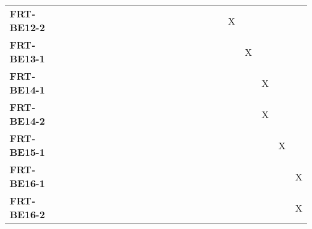 \documentclass[12pt, titlepage]{article}
\begin{document}
\begin{landscape}
\begin{longtable}{|l|cccccccccccccccc|}
		\textbf{FRT-BE12-2} & ~                                                         & ~            & ~            & ~            & ~            & ~            & ~            & ~            & ~            & ~             & ~             & X             & ~             & ~             & ~             & ~             \\
		\textbf{FRT-BE13-1} & ~                                                         & ~            & ~            & ~            & ~            & ~            & ~            & ~            & ~            & ~             & ~             & ~             & X             & ~             & ~             & ~             \\
		\textbf{FRT-BE14-1} & ~                                                         & ~            & ~            & ~            & ~            & ~            & ~            & ~            & ~            & ~             & ~             & ~             & ~             & X             & ~             & ~             \\
		\textbf{FRT-BE14-2} & ~                                                         & ~            & ~            & ~            & ~            & ~            & ~            & ~            & ~            & ~             & ~             & ~             & ~             & X             & ~             & ~             \\
		\textbf{FRT-BE15-1} & ~                                                         & ~            & ~            & ~            & ~            & ~            & ~            & ~            & ~            & ~             & ~             & ~             & ~             & ~             & X             & ~             \\
		\textbf{FRT-BE16-1} & ~                                                         & ~            & ~            & ~            & ~            & ~            & ~            & ~            & ~            & ~             & ~             & ~             & ~             & ~             & ~             & X             \\
		\textbf{FRT-BE16-2} & ~                                                         & ~            & ~            & ~            & ~            & ~            & ~            & ~            & ~            & ~             & ~             & ~             & ~             & ~             & ~             & X             \\
		\hline
	\end{longtable}


\end{landscape}
\end{document}
